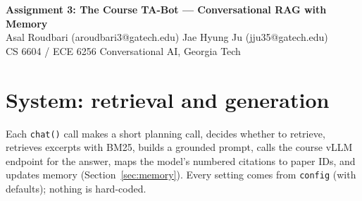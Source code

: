 \documentclass[10pt,letterpaper]{article}
\newcommand{\code}[1]{\texttt{#1}}
\begin{document}
\begin{center}
  {\large\bfseries Assignment 3: The Course TA-Bot --- Conversational RAG with Memory}\\[3pt]
  Asal Roudbari (aroudbari3@gatech.edu) \quad\textbullet\quad Jae Hyung Ju (jju35@gatech.edu)
  \\[1pt]{\small CS 6604 / ECE 6256 Conversational AI, Georgia Tech}
\end{center}

\section{System: retrieval and generation}

Each \code{chat()} call makes a short planning call, decides whether to retrieve, retrieves
excerpts with BM25, builds a grounded prompt, calls the course vLLM endpoint for the answer, maps
the model's numbered citations to paper IDs, and updates memory (Section~\ref{sec:memory}). Every setting comes from \code{config} (with defaults); nothing is hard-coded.
\end{document}
